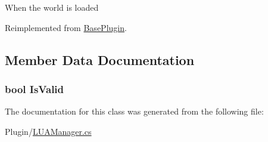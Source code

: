 When the world is loaded 



Reimplemented from \hyperlink{classOTA_1_1Plugin_1_1BasePlugin_a756fe44dfeb738b144ad91ef76ae2e7f}{Base\+Plugin}.



\subsection{Member Data Documentation}
\hypertarget{classOTA_1_1Plugin_1_1LUAPlugin_a62885a2911b2c21274564c3d9e407c2c}{}
\subsubsection[{Is\+Valid}]{\setlength{\rightskip}{0pt plus 5cm}bool Is\+Valid\hspace{0.3cm}{\ttfamily [package]}}\label{classOTA_1_1Plugin_1_1LUAPlugin_a62885a2911b2c21274564c3d9e407c2c}


The documentation for this class was generated from the following file\+:\begin{DoxyCompactItemize}
\item 
Plugin/\hyperlink{LUAManager_8cs}{L\+U\+A\+Manager.\+cs}\end{DoxyCompactItemize}
